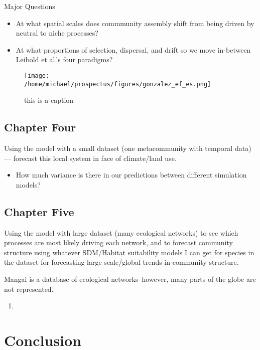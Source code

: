 \documentclass[]{article}
\begin{document}
Major Questions
\begin{itemize}
    \item At what spatial scales does commmunity assembly shift from being driven by neutral to niche processes?
    \item At what proportions of selection, dispersal, and drift so we move in-between Leibold et al.'s four paradigms?

\end{itemize}


\renewcommand*{\arraystretch}{1.4}
\begin{figure}[H]
\centering
\texttt{[image: /home/michael/prospectus/figures/gonzalez\_ef\_es.png]}
\caption{this is a caption}
\end{figure}

\subsection{Chapter Four}

Using the model with a small dataset (one metacommunity with temporal data) --- forecast this local system in face of climate/land use.

\begin{itemize}
    \item How much variance is there in our predictions between different simulation models?
\end{itemize}

\subsection{Chapter Five}

Using the model with large dataset (many ecological networks) to see which processes are most likely driving each network, and to forecast community structure using whatever SDM/Habitat suitability models I can get for species in the dataset for forecasting large-scale/global trends in community structure.

Mangal is a database of ecological networks--however, many parts of the globe are not represented.

\begin{enumerate}
    \item
\end{enumerate}


\hypertarget{conclusion}{%
\section{Conclusion}\label{conclusion}}
\end{document}
